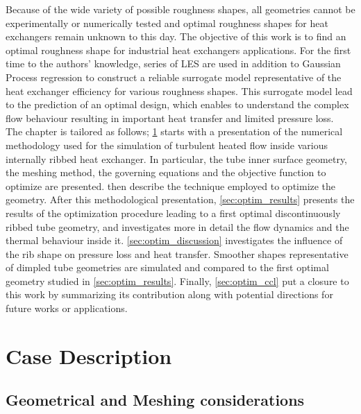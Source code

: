 Because of the wide variety of possible roughness shapes, all geometries cannot be experimentally or numerically tested and optimal roughness shapes for heat exchangers remain unknown to this day. The objective of this work is to find an optimal roughness shape for industrial heat exchangers applications. For the first time to the authors’ knowledge, series of LES are used in addition to Gaussian Process regression \cite{rasmussen2006} to construct a reliable surrogate model representative of the heat exchanger efficiency for various roughness shapes. This surrogate model lead to the prediction of an optimal design, which enables to understand the complex flow behaviour resulting in important heat transfer and limited pressure loss.\\

The chapter is tailored as follows; \cref{sec:optim_case} starts with a presentation of the numerical methodology used for the simulation of turbulent heated flow inside various internally ribbed heat exchanger. In particular, the tube inner surface geometry, the meshing method, the governing equations and the objective function to optimize are presented.  then describe the technique employed to optimize the geometry. After this methodological presentation, \cref{sec:optim_results} presents the results of the optimization procedure leading to a first optimal discontinuously ribbed tube geometry, and investigates more in detail the flow dynamics and the thermal behaviour inside it. \cref{sec:optim_discussion} investigates the influence of the rib shape on pressure loss and heat transfer. Smoother shapes representative of dimpled tube geometries are simulated and compared to the first optimal geometry studied in \cref{sec:optim_results}. Finally, \cref{sec:optim_ccl} put a closure to this work by summarizing its contribution along with potential directions for future works or applications.

\section{Case Description}
\label{sec:optim_case}

\subsection{Geometrical and Meshing considerations}

